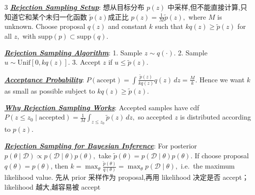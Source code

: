 \documentclass[12pt]{article}
\newcommand{\bulletPoint}[1]{\underline{\textit{\textbf{#1}}}}
\begin{document}
\begin{multicols*}{3}
\bulletPoint{Rejection Sampling Setup}:
想从目标分布 $p(z)$ 中采样,但不能直接计算,只知道它和某个未归一化函数 $\tilde p(z)$成正比
$p(z)=\frac{1}{M}\tilde p(z),$
where $M$ is unknown.
Choose proposal $q(z)$ and constant $k$ such that
$kq(z)\ge \tilde p(z)$ for all $z,$
with $\mathrm{supp}(p)\subset \mathrm{supp}(q).$

\bulletPoint{Rejection Sampling Algorithm}:
1. Sample $z\sim q(\cdot).$
2. Sample $u\sim \mathrm{Unif}[0,kq(z)].$
3. Accept $z$ if $u\le \tilde p(z).$

\bulletPoint{Acceptance Probability}:
\textcolor{purple!60!black}{$\textstyle
P(\text{accept})
=
\int \frac{\tilde p(z)}{kq(z)}q(z)\,dz
=
\frac{M}{k}.
$}
Hence we want $k$ as small as possible subject to $kq(z)\ge \tilde p(z).$

\bulletPoint{Why Rejection Sampling Works}:
Accepted samples have cdf
$\textstyle P(z\le z_0\mid \text{accepted})=\frac{1}{M}\int_{z\le z_0}\tilde p(z)\,dz,$
so accepted $z$ is distributed according to $p(z).$

\bulletPoint{Rejection Sampling for Bayesian Inference}:
For posterior
$p(\theta\mid \mathcal D)\propto p(\mathcal D\mid \theta)p(\theta),$
take
$\tilde p(\theta)=p(\mathcal D\mid \theta)p(\theta).$
If choose proposal $q(\theta)=p(\theta)$, then
$k=\max_\theta \frac{\tilde p(\theta)}{q(\theta)}=\max_\theta p(\mathcal D\mid \theta),$
i.e.\ the maximum likelihood value.
先从 prior 采样作为 proposal,再用 likelihood 决定是否 accept；
likelihood 越大,越容易被 accept






\end{multicols*}
\end{document}
